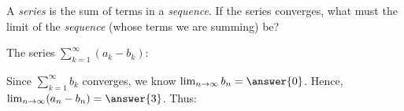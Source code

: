 \documentclass{ximera}
\begin{document}
\begin{exercise}
\begin{exercise}
\begin{exercise}
\begin{hint}
A \emph{series} is the sum of terms in a \emph{sequence}.  If the series converges, what must the limit of the \emph{sequence} (whose terms we are summing) be?
\end{hint}
\end{exercise}
\end{exercise}

\begin{exercise}
The series $\sum_{k=1}^{\infty} (a_k -b_k)$:
\begin{multipleChoice}
\end{multipleChoice}

\begin{hint}
Since $\sum_{k=1}^{\infty} b_k$ converges, we know $\lim_{n \to \infty} b_n = \answer{0}$.  Hence, $\lim_{n \to \infty} (a_n-b_n) = \answer{3}$.  Thus:

\begin{multipleChoice}
\end{multipleChoice}
\end{hint}
\end{exercise}

\end{exercise}
\end{document}
